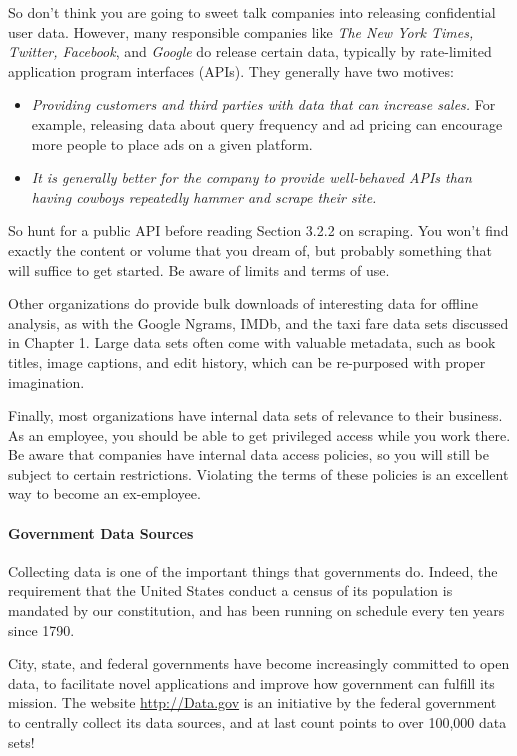 \documentclass[10pt]{article}
\begin{document}
So don’t think you are going to sweet talk companies into releasing confidential user data. However, many responsible companies like \textit{The New York Times, Twitter, Facebook}, and \textit{Google} do release certain data, typically by rate-limited application program interfaces (APIs). They generally have two motives:

\begin{itemize}
  \item \textit{Providing customers and third parties with data that can increase sales.} For example, releasing data about query frequency and ad pricing can encourage more people to place ads on a given platform.
  \item \textit{It is generally better for the company to provide well-behaved APIs than having cowboys repeatedly hammer and scrape their site.}
\end{itemize}

So hunt for a public API before reading Section 3.2.2 on scraping. You won’t find exactly the content or volume that you dream of, but probably something that will suffice to get started. Be aware of limits and terms of use.

Other organizations do provide bulk downloads of interesting data for offline analysis, as with the Google Ngrams, IMDb, and the taxi fare data sets discussed in Chapter 1. Large data sets often come with valuable metadata, such as book titles, image captions, and edit history, which can be re-purposed with proper imagination.

Finally, most organizations have internal data sets of relevance to their business. As an employee, you should be able to get privileged access while you work there. Be aware that companies have internal data access policies, so you will still be subject to certain restrictions. Violating the terms of these policies is an excellent way to become an ex-employee.

\paragraph{Government Data Sources}
Collecting data is one of the important things that governments do. Indeed, the requirement that the United States conduct a census of its population is mandated by our constitution, and has been running on schedule every ten years since 1790.

City, state, and federal governments have become increasingly committed to open data, to facilitate novel applications and improve how government can fulfill its mission. The website \href{http://Data.gov}{http://Data.gov} is an initiative by the federal government to centrally collect its data sources, and at last count points to over 100,000 data sets!
\end{document}
